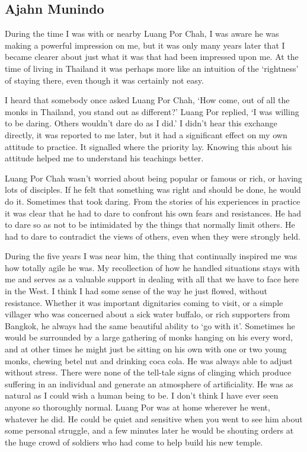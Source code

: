 \subsection{Ajahn Munindo}

During the time I was with or nearby Luang Por Chah, I was aware he was
making a powerful impression on me, but it was only many years later
that I became clearer about just what it was that had been impressed
upon me. At the time of living in Thailand it was perhaps more like an
intuition of the `rightness' of staying there, even though it was
certainly not easy. 

I heard that somebody once asked Luang Por Chah, `How come, out of all
the monks in Thailand, you stand out as different?' Luang Por replied,
`I was willing to be daring. Others wouldn't dare do as I did.' I didn't
hear this exchange directly, it was reported to me later, but it had a
significant effect on my own attitude to practice. It signalled where
the priority lay. Knowing this about his attitude helped me to
understand his teachings better. 

Luang Por Chah wasn't worried about being popular or famous or rich, or
having lots of disciples. If he felt that something was right and should
be done, he would do it. Sometimes that took daring. From the stories of
his experiences in practice it was clear that he had to dare to confront
his own fears and resistances. He had to dare so as not to be
intimidated by the things that normally limit others. He had to dare to
contradict the views of others, even when they were strongly held. 

During the five years I was near him, the thing that continually
inspired me was how totally agile he was. My recollection of how he
handled situations stays with me and serves as a valuable support in
dealing with all that we have to face here in the West. I think I had
some sense of the way he just flowed, without resistance. Whether it was
important dignitaries coming to visit, or a simple villager who was
concerned about a sick water buffalo, or rich supporters from Bangkok, 
he always had the same beautiful ability to `go with it'. Sometimes he
would be surrounded by a large gathering of monks hanging on his every
word, and at other times he might just be sitting on his own with one or
two young monks, chewing betel nut and drinking coca cola. He was always
able to adjust without stress. There were none of the tell-tale signs of
clinging which produce suffering in an individual and generate an
atmosphere of artificiality. He was as natural as I could wish a human
being to be. I don't think I have ever seen anyone so thoroughly normal. 
Luang Por was at home wherever he went, whatever he did. He could be
quiet and sensitive when you went to see him about some personal
struggle, and a few minutes later he would be shouting orders at the
huge crowd of soldiers who had come to help build his new temple. 

